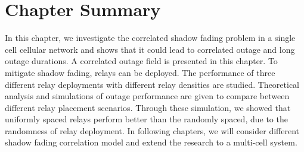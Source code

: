 \section{Chapter Summary}
\label{sec:Conclusions}
In this chapter, we investigate the correlated shadow fading problem in a single cell cellular network and shows that it could lead to correlated outage and long outage durations. A correlated outage field is presented in this chapter. To mitigate shadow fading, relays can be deployed. The performance of three different relay deployments with different relay densities are studied. Theoretical analysis and simulations of outage performance are given to compare between different relay placement scenarios. Through these simulation, we showed that uniformly spaced relays perform better than the randomly spaced, due to the randomness of relay deployment. In following chapters, we will consider different shadow fading correlation model and extend the research to a multi-cell system. 






